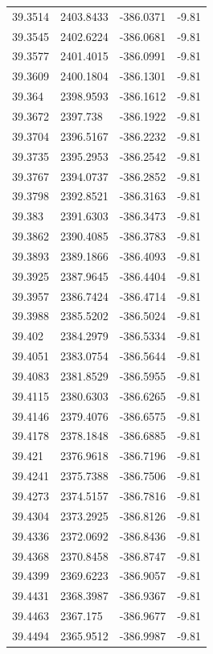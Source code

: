 \begin{table}[H]
\begin{tabular}{llll}
39.3514 & 2403.8433 & -386.0371 & -9.81 \\
39.3545 & 2402.6224 & -386.0681 & -9.81 \\
39.3577 & 2401.4015 & -386.0991 & -9.81 \\
39.3609 & 2400.1804 & -386.1301 & -9.81 \\
39.364 & 2398.9593 & -386.1612 & -9.81 \\
39.3672 & 2397.738 & -386.1922 & -9.81 \\
39.3704 & 2396.5167 & -386.2232 & -9.81 \\
39.3735 & 2395.2953 & -386.2542 & -9.81 \\
39.3767 & 2394.0737 & -386.2852 & -9.81 \\
39.3798 & 2392.8521 & -386.3163 & -9.81 \\
39.383 & 2391.6303 & -386.3473 & -9.81 \\
39.3862 & 2390.4085 & -386.3783 & -9.81 \\
39.3893 & 2389.1866 & -386.4093 & -9.81 \\
39.3925 & 2387.9645 & -386.4404 & -9.81 \\
39.3957 & 2386.7424 & -386.4714 & -9.81 \\
39.3988 & 2385.5202 & -386.5024 & -9.81 \\
39.402 & 2384.2979 & -386.5334 & -9.81 \\
39.4051 & 2383.0754 & -386.5644 & -9.81 \\
39.4083 & 2381.8529 & -386.5955 & -9.81 \\
39.4115 & 2380.6303 & -386.6265 & -9.81 \\
39.4146 & 2379.4076 & -386.6575 & -9.81 \\
39.4178 & 2378.1848 & -386.6885 & -9.81 \\
39.421 & 2376.9618 & -386.7196 & -9.81 \\
39.4241 & 2375.7388 & -386.7506 & -9.81 \\
39.4273 & 2374.5157 & -386.7816 & -9.81 \\
39.4304 & 2373.2925 & -386.8126 & -9.81 \\
39.4336 & 2372.0692 & -386.8436 & -9.81 \\
39.4368 & 2370.8458 & -386.8747 & -9.81 \\
39.4399 & 2369.6223 & -386.9057 & -9.81 \\
39.4431 & 2368.3987 & -386.9367 & -9.81 \\
39.4463 & 2367.175 & -386.9677 & -9.81 \\
39.4494 & 2365.9512 & -386.9987 & -9.81 \\

\end{tabular}
\end{table}

